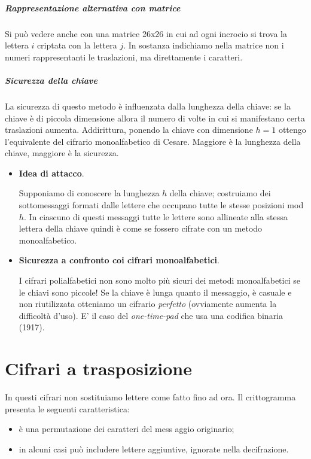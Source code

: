 \paragraph{Rappresentazione alternativa con matrice} Si può vedere anche con una matrice 26x26 in cui ad ogni incrocio si trova la lettera $i$ criptata con la lettera $j$. In sostanza indichiamo nella matrice non i numeri rappresentanti le traslazioni, ma direttamente i caratteri.

\paragraph{Sicurezza della chiave} La sicurezza di questo metodo è influenzata dalla lunghezza della chiave: se la chiave è di piccola dimensione allora il numero di volte in cui si manifestano certa traslazioni aumenta. Addirittura, ponendo la chiave con dimensione $h=1$ ottengo l'equivalente del cifrario monoalfabetico di Cesare. Maggiore è la lunghezza della chiave, maggiore è la sicurezza.
\begin{itemize}
	\item \textbf{Idea di attacco}.
	
	Supponiamo di conoscere la lunghezza $h$ della chiave; costruiamo dei sottomessaggi formati dalle lettere che occupano tutte le stesse posizioni mod $h$. In ciascuno di questi messaggi tutte le lettere sono allineate alla stessa lettera della chiave quindi è come se fossero cifrate con un metodo monoalfabetico.
	
	\item \textbf{Sicurezza a confronto coi cifrari monoalfabetici}.
	
	I cifrari polialfabetici non sono molto più sicuri dei metodi monoalfabetici se le chiavi sono piccole! Se la chiave è lunga quanto il messaggio, è casuale e non riutilizzata otteniamo un cifrario \emph{perfetto} (ovviamente aumenta la difficoltà d'uso). E' il caso del \emph{one-time-pad} che usa una codifica binaria (1917).
\end{itemize}
\clearpage 

\chapter{Cifrari a trasposizione}
In questi cifrari non sostituiamo lettere come fatto fino ad ora. Il crittogramma presenta le seguenti caratteristica:
\begin{itemize}
	\item è una permutazione dei caratteri del mess aggio originario;
	\item in alcuni casi può includere lettere aggiuntive, ignorate nella decifrazione.
\end{itemize}

